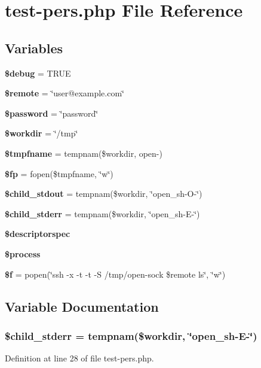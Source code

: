 \section{test-pers.php File Reference}
\label{test-pers_8php}
\subsection*{Variables}
\begin{CompactItemize}
\item 
{\bf \$debug} = TRUE
\item 
{\bf \$remote} = \char`\"{}user@example.com\char`\"{}
\item 
{\bf \$password} = \char`\"{}password\char`\"{}
\item 
{\bf \$workdir} = \char`\"{}/tmp\char`\"{}
\item 
{\bf \$tmpfname} = tempnam(\$workdir, open-)
\item 
{\bf \$fp} = fopen(\$tmpfname, \char`\"{}w\char`\"{})
\item 
{\bf \$child\_\-stdout} = tempnam(\$workdir, \char`\"{}open\_\-sh-O-\char`\"{})
\item 
{\bf \$child\_\-stderr} = tempnam(\$workdir, \char`\"{}open\_\-sh-E-\char`\"{})
\item 
{\bf \$descriptorspec}
\item 
{\bf \$process}
\item 
{\bf \$f} = popen(\char`\"{}ssh -x -t -t -S /tmp/open-sock \$remote ls\char`\"{}, \char`\"{}w\char`\"{})
\end{CompactItemize}


\subsection{Variable Documentation}
\subsubsection{\setlength{\rightskip}{0pt plus 5cm}\$child\_\-stderr = tempnam(\$workdir, \char`\"{}open\_\-sh-E-\char`\"{})}\label{test-pers_8php_a7}




Definition at line 28 of file test-pers.php.

